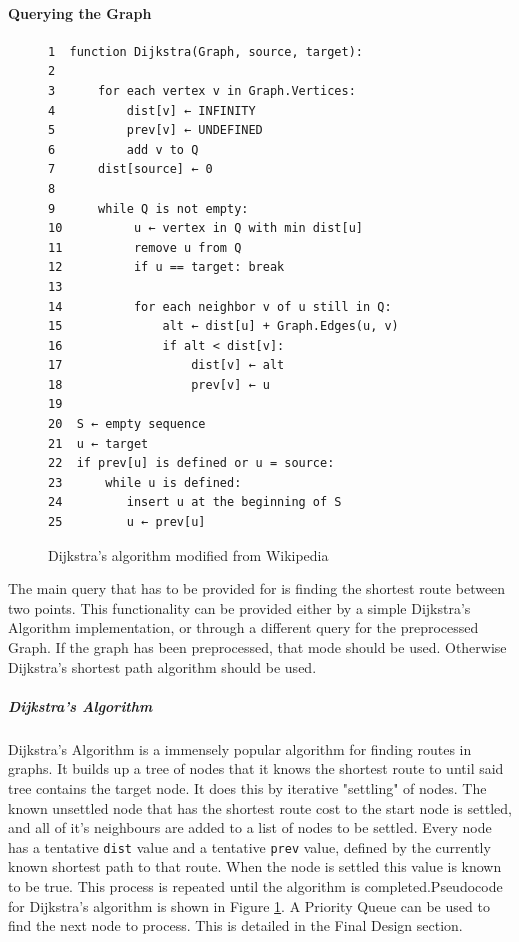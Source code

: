 \documentclass[11pt,twoside,a4paper]{article}
\begin{document}
\paragraph{Querying the Graph}
\begin{figure}[t]
    \begin{center}
\begin{verbatim}
1  function Dijkstra(Graph, source, target):
2
3      for each vertex v in Graph.Vertices:            
4          dist[v] ← INFINITY                 
5          prev[v] ← UNDEFINED                
6          add v to Q                     
7      dist[source] ← 0                       
8     
9      while Q is not empty:
10          u ← vertex in Q with min dist[u]   
11          remove u from Q
12          if u == target: break
13                                        
14          for each neighbor v of u still in Q:
15              alt ← dist[u] + Graph.Edges(u, v)
16              if alt < dist[v]:              
17                  dist[v] ← alt
18                  prev[v] ← u
19
20  S ← empty sequence
21  u ← target
22  if prev[u] is defined or u = source:
23      while u is defined:
24         insert u at the beginning of S
25         u ← prev[u]
\end{verbatim}
\end{center}
\caption{Dijkstra's algorithm modified from Wikipedia\cite{dijkstrapseudo}}
\label{dijkstrapseudo}
\end{figure}
The main query that has to be provided for is finding the shortest route between two points. This functionality can be provided either by a simple Dijkstra's Algorithm implementation, or through a different query for the preprocessed Graph. If the graph has been preprocessed,
that mode should be used. Otherwise Dijkstra's shortest path algorithm should be used. 
\subparagraph{Dijkstra's Algorithm}
Dijkstra's Algorithm\cite{Dijkstra1959} is a immensely popular algorithm for finding routes in graphs. It builds up a tree of nodes that it knows the shortest route to until said tree contains the target node. It does this by iterative "settling" of nodes.
The known unsettled node that has the shortest route cost to the start node is settled, and all of it's neighbours are added to a list of nodes to be settled. Every node has a tentative \texttt{dist} value and a tentative \texttt{prev} value, defined by the currently known shortest path to that route.
When the node is settled this value is known to be true. This process is repeated until the algorithm is completed.Pseudocode for Dijkstra's algorithm is shown in Figure \ref{dijkstrapseudo}. A Priority Queue can be used to find the next node to process. This is detailed in the Final Design section.
\end{document}
